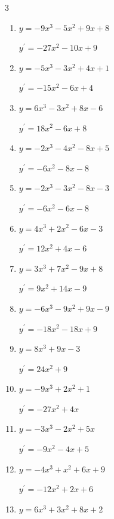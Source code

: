 \begin{multicols}{3}
\begin{enumerate}
        $\displaystyle y^{\prime}=-6x^{2}+10x+4$

  \item $y=-9x^{3}-5x^{2}+9x+8$

        $\displaystyle y^{\prime}=-27x^{2}-10x+9$

  \item $y=-5x^{3}-3x^{2}+4x+1$

        $\displaystyle y^{\prime}=-15x^{2}-6x+4$

  \item $y=6x^{3}-3x^{2}+8x-6$

        $\displaystyle y^{\prime}=18x^{2}-6x+8$

\columnbreak %

  \item $y=-2x^{3}-4x^{2}-8x+5$

        $\displaystyle y^{\prime}=-6x^{2}-8x-8$

  \item $y=-2x^{3}-3x^{2}-8x-3$

        $\displaystyle y^{\prime}=-6x^{2}-6x-8$

  \item $y=4x^{3}+2x^{2}-6x-3$

        $\displaystyle y^{\prime}=12x^{2}+4x-6$

  \item $y=3x^{3}+7x^{2}-9x+8$

        $\displaystyle y^{\prime}=9x^{2}+14x-9$

  \item $y=-6x^{3}-9x^{2}+9x-9$

        $\displaystyle y^{\prime}=-18x^{2}-18x+9$

  \item $y=8x^{3}+9x-3$

        $\displaystyle y^{\prime}=24x^{2}+9$

  \item $y=-9x^{3}+2x^{2}+1$

        $\displaystyle y^{\prime}=-27x^{2}+4x$

  \item $y=-3x^{3}-2x^{2}+5x$

        $\displaystyle y^{\prime}=-9x^{2}-4x+5$

  \item $y=-4x^{3}+x^{2}+6x+9$

        $\displaystyle y^{\prime}=-12x^{2}+2x+6$

  \item $y=6x^{3}+3x^{2}+8x+2$


\end{enumerate}
\end{multicols}
